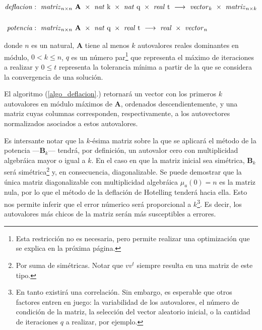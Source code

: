 \begin{align*}
    \text{\textit{deflacion}}&:\ \text{\textit{matriz}}_{n \times n}\ \mathbf{A}\ \times\ \text{\textit{nat} k}\ \times\ \text{\textit{nat} q}\ \times\ \text{\textit{real} t}\
    \longrightarrow\ \text{\textit{vector}}_k\ \times\ \text{\textit{matriz}}_{n \times k}
    \\ \\
    \text{\textit{potencia}}&:\ \text{\textit{matriz}}_{n \times n}\ \mathbf{A}\ \times\ \text{\textit{nat} q}\ \times\ \text{\textit{real} t}\ 
    \longrightarrow\ \text{\textit{real}}\ \times\ \text{\textit{vector}}_n
\end{align*}

\vspace{1em}
\noindent donde $n$ es un natural, \textbf{A} tiene al menos $k$ autovalores reales dominantes en módulo, $0 < k \leq n$, $q$ es un número par\footnote{Esta restricción no es necesaria, pero permite realizar una optimización que se explica en la próxima página.} que representa el máximo de iteraciones a realizar y $0 \leq t$ representa la tolerancia mínima a partir de la que se considera la convergencia de una solución. 

\vspace{1em}


\vspace{1em}
El algoritmo (\ref{algo_deflacion}.) retornará un vector con los primeros $k$ autovalores en módulo máximos de \textbf{A}, ordenados descendientemente, y una matriz cuyas columnas corresponden, respectivamente, a los autovectores normalizados asociados a estos autovalores. 

\vspace{1em}
Es intersante notar que la $k$-ésima matriz sobre la que se aplicará el método de la potencia ---\textbf{B}$_k$--- tendrá, por definición, un autovalor cero con multiplicidad algebráica mayor o igual a $k$. En el caso en que la matriz inicial sea simétrica, \textbf{B}$_k$ será simétrica\footnote{Por suma de simétricas. Notar que $v v^t$ siempre resulta en una matriz de este tipo.} y, en consecuencia, diagonalizable. Se puede demostrar que la única matriz diagonalizable con multiplicidad algebráica $\mu_{a}(0) = n$ es la matriz nula, por lo que el método de la deflación de Hotelling tenderá hacia ella. Esto nos permite inferir que el error númerico será proporcional a $k$\footnote{En tanto existirá una correlación. Sin embargo, es esperable que otros factores entren en juego: la variabilidad de los autovalores, el número de condición de la matriz, la selección del vector aleatorio inicial, o la cantidad de iteraciones $q$ a realizar, por ejemplo.}. Es decir, los autovalores más chicos de la matriz serán más susceptibles a errores.  


